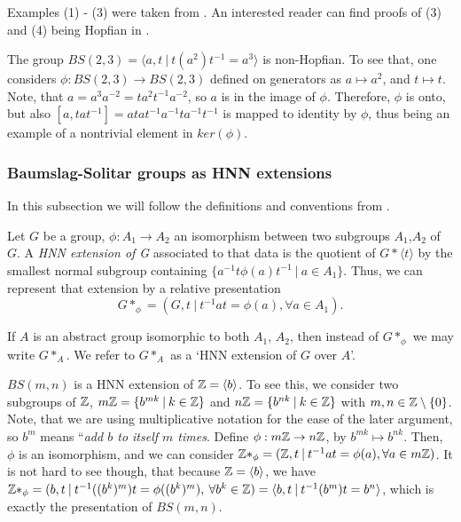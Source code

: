 Examples (1) - (3) were taken from \cite{CeSi23}. An interested reader can find proofs of (3) and (4) being Hopfian in \cite[~chapters I, IV]{LySch15}. 

\begin{importantexample}\cite[page 514]{BrHa11}
    The group $BS(2,3) = \langle a,t \: | \: t(a^2)t^{-1} = a^3\rangle $ is non-Hopfian. To see that, one considers $\phi: BS(2,3) \to BS(2,3)$ defined on generators as $a \mapsto a^2$, and $t \mapsto t$. Note, that $a = a^3a^{-2} = ta^2t^{-1}a^{-2}$, so $a$ is in the image of $\phi$. Therefore, $\phi$ is onto, but also $[a,tat^{-1}] = atat^{-1}a^{-1}ta^{-1}t^{-1}$ is mapped to identity by $\phi$, thus being an example of a nontrivial element in $ker(\phi)$.
\end{importantexample}

\subsubsection{Baumslag-Solitar groups as HNN extensions}

In this subsection we will follow the definitions and conventions from \cite[pages 497-498]{BrHa11}.

\begin{definition}
\label{HNN}
    Let $G$ be a group, $\phi: A_1 \to A_2$ an isomorphism between two subgroups $A_1$,$A_2$ of $G$. A \emph{HNN extension of G} associated to that data is the quotient of $G \ast \langle t \rangle$ by the smallest normal subgroup containing $\{a^{-1}t\phi(a)t^{-1} \: | \: a \in A_1 \}$. Thus, we can represent that extension by a relative presentation 
    \[G \ast_\phi = ( G,t \: | \: t^{-1}at = \phi(a), \forall a \in A_1). \]
\end{definition}

\begin{remark}
    If $A$ is an abstract group isomorphic to both $A_1$, $A_2$, then instead of $G \ast _\phi$ we may write $G \ast _A$. We refer to $G \ast _A$ as a `HNN extension of $G$ over $A$'.
\end{remark}

\begin{example}\label{BS as HNN}
    $BS(m,n)$ is a HNN extension of $\mathbb{Z}  =\langle b \rangle$. To see this, we consider two subgroups of $\mathbb{Z}$, $m\mathbb{Z} = \{b^{mk}\: | \: k \in \mathbb{Z}\}$ and $n\mathbb{Z} = \{b^{nk}\: | \: k \in \mathbb{Z}\}$ with $m,n \in \mathbb{Z} \setminus \{0\}$. Note, that we are using multiplicative notation for the ease of the later argument, so $b^m$ means ``\emph{add $b$ to itself $m$ times}. Define $\phi: m\mathbb{Z} \to n\mathbb{Z}$, by $b^{mk} \mapsto b^{nk}$. Then, $\phi$ is an isomorphism, and we can consider $\mathbb{Z}\ast_\phi = (\mathbb{Z},t \: | \: t^{-1}at = \phi(a), \forall a\in m\mathbb{Z})$. It is not hard to see though, that because $\mathbb{Z} = \langle b \rangle$, we have $\mathbb{Z}\ast_\phi = ( b,t \: | \: t^{-1}((b^k)^m)t = \phi((b^k)^m), \: \forall b^k\in \mathbb{Z} ) = \langle b,t \: | \: t^{-1}(b^m)t = b^n\rangle $, which is exactly the presentation of $BS(m,n)$.
\end{example}

